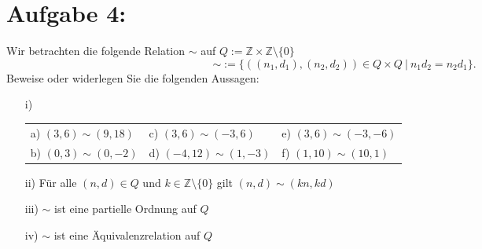 \documentclass{exam}
\begin{document}
\section*{Aufgabe 4:}
Wir betrachten die folgende Relation $\sim$ auf $Q := \mathbb{Z} \times \mathbb{Z}\setminus\{0\}$ \[
    \sim := \{((n_1,d_1),(n_2,d_2)) \in Q \times Q\ |\ n_1d_2 = n_2d_1\}.
\]
Beweise oder widerlegen Sie die folgenden Aussagen:
\begin{enumerate}
    \item [i)]
          \renewcommand{\arraystretch}{1.5}
          \begin{tabularx}{\textwidth}{ X X X }
              a) $(3,6) \sim (9,18)$ & c) $(3,6) \sim (-3, 6)$   & e) $(3, 6) \sim (-3, -6)$ \\
              b) $(0,3) \sim (0,-2)$ & d) $(-4,12) \sim (1, -3)$ & f) $(1, 10) \sim (10, 1)$
          \end{tabularx}
    \item [ii)] Für alle $(n,d) \in Q$ und $k \in \mathbb{Z}\setminus\{0\}$ gilt $(n,d) \sim (kn,kd)$
    \item [iii)] $\sim$ ist eine partielle Ordnung auf $Q$
    \item [iv)] $\sim$ ist eine Äquivalenzrelation auf $Q$
\end{enumerate}
\end{document}
